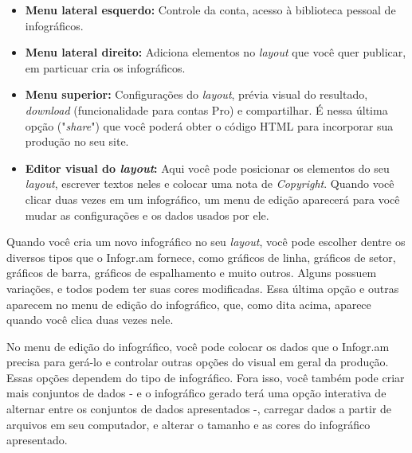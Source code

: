 \documentclass[12pt,onecolumn]{article}
\begin{document}
    \begin{itemize}
      \item
        \textbf{Menu lateral esquerdo:}
        Controle da conta, acesso à biblioteca pessoal de
        infográficos.
      \item
        \textbf{Menu lateral direito:}
        Adiciona elementos no \textit{layout} que você quer
        publicar, em particuar cria os infográficos.
      \item
        \textbf{Menu superior:}
        Configurações do \textit{layout}, prévia visual do resultado,
        \textit{download} (funcionalidade para contas Pro) e compartilhar. É nessa
        última opção ("\textit{share}") que você poderá obter o código HTML para
        incorporar sua produção no seu site.
      \item
        \textbf{Editor visual do \textit{layout}:}
        Aqui você pode posicionar os elementos do seu \textit{layout}, escrever
        textos neles e colocar uma nota de \textit{Copyright}. Quando você clicar
        duas vezes em um infográfico, um menu de edição aparecerá para você mudar
        as configurações e os dados usados por ele.
    \end{itemize}
    
    Quando você cria um novo infográfico no seu \textit{layout}, você pode
    escolher dentre os diversos tipos que o Infogr.am fornece, como gráficos de
    linha, gráficos de setor, gráficos de barra, gráficos de espalhamento e
    muito outros. Alguns possuem variações, e todos podem ter suas cores
    modificadas. Essa última opção e outras aparecem no menu de edição do
    infográfico, que, como dita acima, aparece quando você clica duas vezes
    nele.
    
    No menu de edição do infográfico, você pode colocar os dados que o Infogr.am
    precisa para gerá-lo e controlar outras opções do visual em geral da
    produção. Essas opções dependem do tipo de infográfico. Fora isso, você
    também pode criar mais conjuntos de dados - e o infográfico gerado terá uma
    opção interativa de alternar entre os conjuntos de dados apresentados -,
    carregar dados a partir de arquivos em seu computador, e alterar o tamanho e
    as cores do infográfico apresentado.
    
\end{document}
